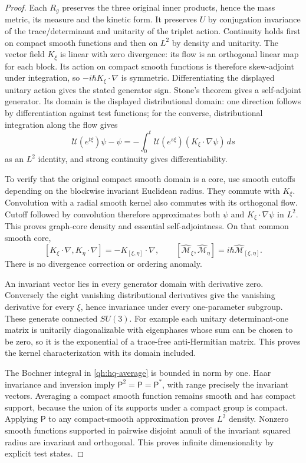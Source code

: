\begin{proof}
Each \(R_g\) preserves the three original inner products, hence the
mass metric, its measure and the kinetic form. It preserves \(U\)
by conjugation invariance of the trace/determinant and unitarity of
the triplet action. Continuity holds first on compact smooth
functions and then on \(L^2\) by density and unitarity.
The vector field \(K_\xi\) is linear with zero divergence: its flow
is an orthogonal linear map for each block. Its action on compact
smooth functions is therefore skew-adjoint under integration, so
\(-i\hbar K_\xi\cdot\nabla\) is symmetric. Differentiating the
displayed unitary action gives the stated generator sign.
Stone's theorem gives a self-adjoint generator. Its domain is
the displayed distributional domain: one direction follows by
differentiation against test functions; for the converse,
distributional integration along the flow gives
\[
 \mathcal U(e^{t\xi})\psi-\psi
   =-\int_0^t\mathcal U(e^{s\xi})
                   (K_\xi\cdot\nabla\psi)\,ds
\]
as an \(L^2\) identity, and strong continuity gives differentiability.

To verify that the original compact smooth domain is a core, use
smooth cutoffs depending on the blockwise invariant Euclidean radius.
They commute with \(K_\xi\). Convolution with a radial smooth kernel
also commutes with its orthogonal flow. Cutoff followed by convolution
therefore approximates both \(\psi\) and \(K_\xi\cdot\nabla\psi\)
in \(L^2\). This proves graph-core density and essential
self-adjointness. On that common smooth core,
\[
 [K_\xi\cdot\nabla,K_\eta\cdot\nabla]
   =-K_{[\xi,\eta]}\cdot\nabla,\qquad
 [\widehat{\mathcal M}_\xi,\widehat{\mathcal M}_\eta]
   =i\hbar\widehat{\mathcal M}_{[\xi,\eta]}.
\]
There is no divergence correction or ordering anomaly.

An invariant vector lies in every generator domain with derivative
zero. Conversely the eight vanishing distributional derivatives
give the vanishing derivative for every \(\xi\), hence invariance
under every one-parameter subgroup. These generate connected \(SU(3)\).
For example each unitary determinant-one matrix is unitarily
diagonalizable with eigenphases whose sum can be chosen to be zero,
so it is the exponential of a trace-free anti-Hermitian matrix.
This proves the kernel characterization with its domain included.

The Bochner integral in \eqref{qh:hq-average} is bounded in norm
by one. Haar invariance and inversion imply
\(\mathsf P^2=\mathsf P=\mathsf P^*\), with range precisely the
invariant vectors. Averaging a compact smooth function remains
smooth and has compact support, because the union of its supports
under a compact group is compact. Applying \(\mathsf P\) to any
compact-smooth approximation proves \(L^2\) density.
Nonzero smooth functions supported in pairwise disjoint annuli of
the invariant squared radius are invariant and orthogonal.
This proves infinite dimensionality by explicit test states.


\end{proof}
